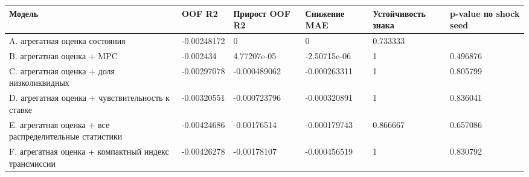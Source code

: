 \begin{tabular}{llllll}
\toprule
Модель & OOF R2 & Прирост OOF R2 & Снижение MAE & Устойчивость знака & p-value по shock seed \\
\midrule
A. агрегатная оценка состояния & -0.00248172 & 0 & 0 & 0.733333 &  \\
B. агрегатная оценка + MPC & -0.002434 & 4.77207e-05 & -2.50715e-06 & 1 & 0.496876 \\
C. агрегатная оценка + доля низколиквидных & -0.00297078 & -0.000489062 & -0.000263311 & 1 & 0.805799 \\
D. агрегатная оценка + чувствительность к ставке & -0.00320551 & -0.000723796 & -0.000320891 & 1 & 0.836041 \\
E. агрегатная оценка + все распределительные статистики & -0.00424686 & -0.00176514 & -0.000179743 & 0.866667 & 0.657086 \\
F. агрегатная оценка + компактный индекс трансмиссии & -0.00426278 & -0.00178107 & -0.000456519 & 1 & 0.830792 \\
\bottomrule
\end{tabular}

